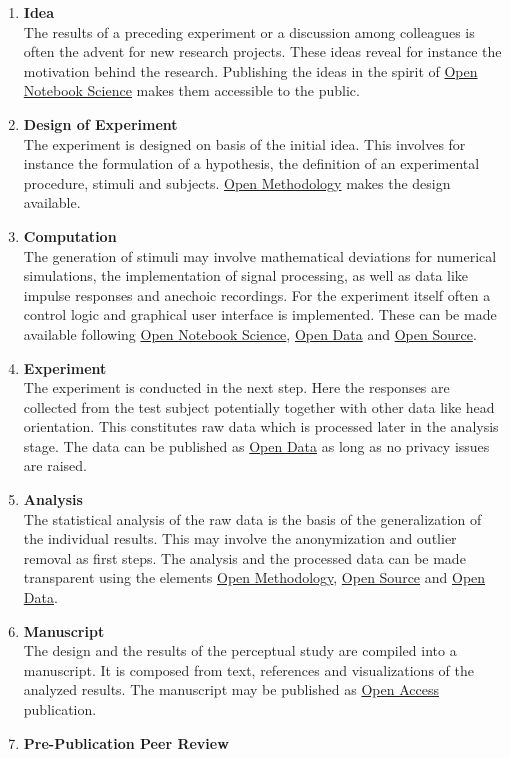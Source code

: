 \documentclass[a4paper, 10pt, twocolumn]{article}
\begin{document}
\begin{enumerate}
\item \textbf{Idea}\\
The results of a preceding experiment or a discussion among colleagues is often the advent 
for new research projects. These ideas reveal for instance the motivation behind the research. 
Publishing the ideas in the spirit of \underline{Open Notebook Science} makes them accessible 
to the public.
%
\item \textbf{Design of Experiment}\\
The experiment is designed on basis of the initial idea. This involves for instance the formulation 
of a hypothesis, the definition of an experimental procedure, stimuli and subjects. \underline{Open Methodology} 
makes the design available.
%
\item\textbf{Computation}\\
The generation of stimuli may involve mathematical deviations for numerical simulations, the 
implementation of signal processing, as well as data like impulse responses and anechoic recordings. For the
experiment itself often a control logic and graphical user interface is implemented. These can be made available 
following \underline{Open Notebook Science}, \underline{Open Data} and \underline{Open Source}.
%
\item \textbf{Experiment}\\
The experiment is conducted in the next step. Here the responses are collected from the test subject potentially 
together with other data like head orientation. This constitutes raw data which is processed later in the analysis stage. 
The data can be published as \underline{Open Data} as long as no privacy issues are raised.
%
\item \textbf{Analysis}\\
The statistical analysis of the raw data is the basis of the generalization of the individual results. This may
involve the anonymization and outlier removal as first steps. The analysis and the processed data can be made 
transparent using the elements \underline{Open Methodology}, \underline{Open Source} and \underline{Open Data}.
%
\item \textbf{Manuscript}\\
The design and the results of the perceptual study are compiled into a manuscript. It is composed
from text, references and visualizations of the analyzed results. The manuscript may be published 
as \underline{Open Access} publication.
%
\item \textbf{Pre-Publication Peer Review}\\

\end{enumerate}
\end{document}
